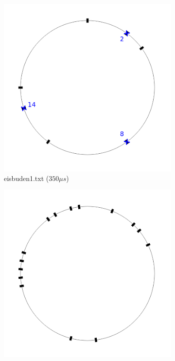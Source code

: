 \documentclass[a4paper,10pt,ngerman,captions=figureheading]{scrartcl}
\newcommand{\imageWidth}{0.3\linewidth}
\begin{document}
\begin{figure}[ht]
    \centering
    \caption{Stabile Arrangements mit den niedrigsten Eisdielendistanzen der Beispieldateien}
    \label{fig:BWINF_Beispiele}
    \begin{subfigure}[t]{\imageWidth}
        \includegraphics[width=\linewidth]{eisbuden1.png}
        \caption{eisbuden1.txt ($350\mu s$)}
        \label{fig:eisbuden1}
    \end{subfigure}
    \begin{subfigure}[t]{\imageWidth}
        \includegraphics[width=\linewidth]{eisbuden2.png}

\end{subfigure}
\end{figure}
\end{document}

